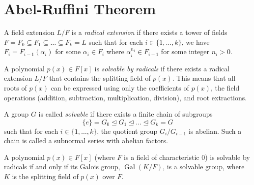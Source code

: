 \chapter{Abel-Ruffini Theorem}

\begin{definition}
    \label{def:Solution_by_Radicals}
    A field extension $L/F$ is a \textit{radical extension} if there exists a tower of fields $F = F_0 \subseteq F_1 \subseteq \dots \subseteq F_k = L$ such that for each $i \in \{1, \dots, k\}$, we have $F_i = F_{i-1}(\alpha_i)$ for some $\alpha_i \in F_i$ where $\alpha_i^{n_i} \in F_{i-1}$ for some integer $n_i > 0$.

    A polynomial $p(x) \in F[x]$ is \textit{solvable by radicals} if there exists a radical extension $L/F$ that contains the splitting field of $p(x)$. This means that all roots of $p(x)$ can be expressed using only the coefficients of $p(x)$, the field operations (addition, subtraction, multiplication, division), and root extractions.
\end{definition}

\begin{definition}
    \label{def:Solvable_Group}
    A group $G$ is called \textit{solvable} if there exists a finite chain of subgroups
    \[ \{e\} = G_0 \trianglelefteq G_1 \trianglelefteq \dots \trianglelefteq G_k = G \]
    such that for each $i \in \{1, \dots, k\}$, the quotient group $G_i / G_{i-1}$ is abelian. Such a chain is called a subnormal series with abelian factors.
\end{definition}

\begin{lemma}
    \label{lem:Solvability_Criterion}
    A polynomial $p(x) \in F[x]$ (where $F$ is a field of characteristic 0) is solvable by radicals if and only if its Galois group, $\operatorname{Gal}(K/F)$, is a solvable group, where $K$ is the splitting field of $p(x)$ over $F$.
\end{lemma}

